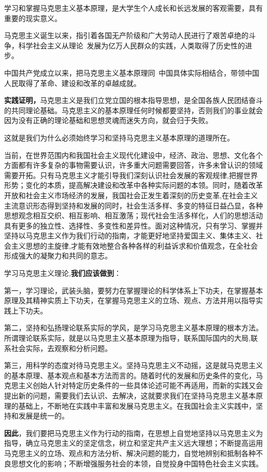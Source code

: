 {学习和掌握马克思主义基本原理，是大学生个人成长和长远发展的客观需要，具有重要的现实意义。}

{马克思主义诞生以来，指引着各国无产阶级和广大劳动人民进行了艰苦卓绝的斗争，科学社会主义从理论~发展为亿万人民群众的实践，人类取得了历史性的进步。}

{中国共产党成立以来，把马克思主义基本原理同~中国具体实际相结合，带领中国人民取得了革命、建设和改革的卓越成就。}

{{\textbf{实践证明，}}{马克思主义是我们立党立国的根本指导思想，是全国各族人民团结奋斗的共同理论基础。马克思主义的基本原理任何时候都要坚持，否则我们的事业就会因为没有正确的理论基础和思想灵魂而迷失方向，就会归于失败。}}

{{这就是我们为什么必须始终学习和坚持马克思主义基本原理的道理所在}{。}}

{当前，在世界范围内和我国社会主义现代化建设中，经济、政治、思想、文化各个方面都有许多复杂的事物需要认识，许多重大问题需要回答，许多未曾认识的领域需要开拓。只有马克思主义才能引导我们深刻认识社会发展的客观规律,把握世界形势；变化的本质，提高解决建设和改革中各种实际问题的本领。同时，随着改革开放和社会主义市场经济的发展，我国社会正发生着深刻的历史变革,在社会主义主流意识形态得到坚持和发展的同时，社会生活多样、多变的特征日益凸显，各种思想观念相互交织、相互影响、相互激荡；现代社会生活多样化，人们的思想活动具有更多的独立性、选择性、多变性和差异性。面对这种情况，只有学习、掌握并坚持以马克思主义作为我们行动的指南，才能更好地坚持爱国主义、集体主义、社会主义思想的主旋律,才能有效地整合各种各样的利益诉求和价值观念，在全社会形成强大的凝聚力和共同的意志。}

{{学习马克思主义理论,}{\textbf{我们应该做到}}{：}}

{{第一}{，学习理论，武装头脑，要努力在掌握理论的科学体系上下功夫，在掌握基本原理及其精神实质上下功夫，在掌握马克思主义的立场、观点、方法并用以指导实践上下功夫。}}

{{第二}{，坚持和弘扬理论联系实际的学风，是学习马克思主义基本原理的根本方法。所谓理论联系实际，就是以马克思主义基本原理为指导，联系国际国内的大局,联系社会实际，去观察和分析问题。}}

{{第三}{，用科学的态度对待马克思主义。坚持马克思主义不动摇，这是就马克思主义的基本原理、基本观点和基本方法而言的。随着时代的发展和历史条件的变化，马克思主义创始人针对特定历史条件的一些具体论述可能不再适用，而新的实践又会提出新的问题，需要我们去认识、去解决，这就要求我们在坚持马克思主义基本原理的基础上，不断地在实践中丰富和发展马克思主义。在我国社会主义实践中，坚持和发展是统一的。}}

{{\textbf{因此}}{，我们要把马克思主义作为行动的指南，在思想上自觉地坚持以马克思主义为指导，确立马克思主义的坚定信念，树立和坚定共产主义远大理想；不断提高运用马克思主义的立场、观点和方法分析、解决问题的能力，自觉地辨别和抵制各种不良思想文化的影响；不断增强服务社会的本领，自觉投身中国特色社会主义实践。}}
